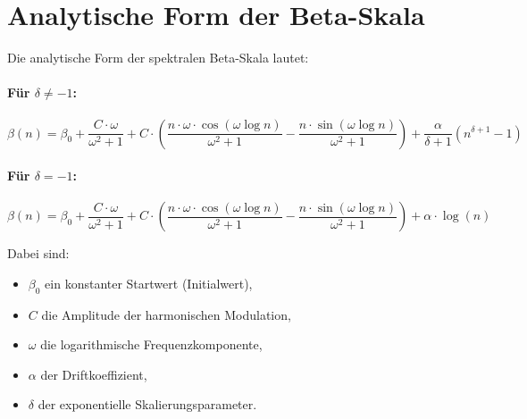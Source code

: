 \documentclass{article}
\begin{document}
\section*{Analytische Form der Beta-Skala}

Die analytische Form der spektralen Beta-Skala lautet:

\paragraph{Für $\delta \neq -1$:}

\begin{equation}
\beta(n) = \beta_0 + \frac{C \cdot \omega}{\omega^2 + 1}
+ C \cdot \left( \frac{n \cdot \omega \cdot \cos(\omega \log n)}{\omega^2 + 1}
- \frac{n \cdot \sin(\omega \log n)}{\omega^2 + 1} \right)
+ \frac{\alpha}{\delta + 1} \left( n^{\delta + 1} - 1 \right)
\end{equation}

\paragraph{Für $\delta = -1$:}

\begin{equation}
\beta(n) = \beta_0 + \frac{C \cdot \omega}{\omega^2 + 1}
+ C \cdot \left( \frac{n \cdot \omega \cdot \cos(\omega \log n)}{\omega^2 + 1}
- \frac{n \cdot \sin(\omega \log n)}{\omega^2 + 1} \right)
+ \alpha \cdot \log(n)
\end{equation}

\bigskip

\noindent
Dabei sind:
\begin{itemize}
    \item $\beta_0$ ein konstanter Startwert (Initialwert),
    \item $C$ die Amplitude der harmonischen Modulation,
    \item $\omega$ die logarithmische Frequenzkomponente,
    \item $\alpha$ der Driftkoeffizient,
    \item $\delta$ der exponentielle Skalierungsparameter.
\end{itemize}
\end{document}
